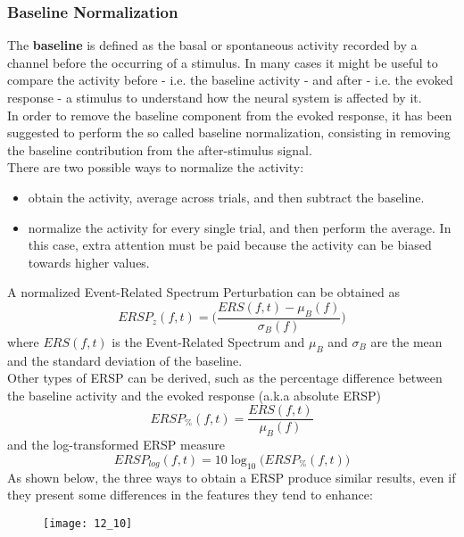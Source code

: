 \subsubsection{Baseline Normalization}
The \textbf{baseline} is defined as the basal or spontaneous
activity recorded by a channel before the occurring of a stimulus. In many cases it might
be useful to compare the activity before - i.e. the baseline activity - and after - i.e. the
evoked response - a stimulus to understand how the neural system is affected by it.\\
In order to remove the baseline component from the evoked response, it has been suggested to
perform the so called baseline normalization, consisting in removing the baseline contribution
from the after-stimulus signal.\\
There are two possible ways to normalize the activity:
\begin{itemize}
    \item obtain the activity, average across trials, and then subtract the baseline.
    \item normalize the activity for every single trial, and then perform the average.
          In this case, extra attention must be paid because the activity can be biased towards
          higher values.
\end{itemize}
A normalized Event-Related Spectrum Perturbation can be
obtained as
\begin{equation*}
    ERSP_z(f,t)=\biggl(\frac{ERS(f,t)-\mu_B(f)}{\sigma_B(f)}\biggr)
\end{equation*}
where \(ERS(f,t)\) is the Event-Related Spectrum and \(\mu_B\) and \(\sigma_B\) are the mean and the
standard deviation of the baseline.\\
Other types of ERSP can be derived, such as the percentage difference between the baseline
activity and the evoked response (a.k.a absolute ERSP)
\begin{equation*}
    ERSP_{\%}(f,t)=\frac{ERS(f,t)}{\mu_{B}(f)}
\end{equation*}
and the log-transformed ERSP measure
\begin{equation*}
    ERSP_{log}(f,t)=10\log_{10}\bigl(ERSP_{\%}(f,t)\bigr)
\end{equation*}
As shown below, the three ways to obtain a ERSP produce similar results, even if they
present some differences in the features they tend to enhance:
\begin{figure}[H]
    \centering
    \texttt{[image: 12\_10]}
\end{figure}
